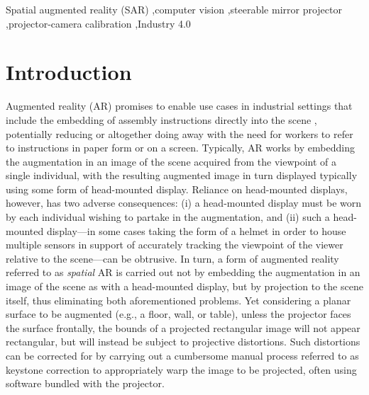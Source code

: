 \documentclass[review]{elsarticle}
\begin{document}
\begin{frontmatter}
\begin{keyword}
Spatial augmented reality (SAR) \sep computer vision \sep steerable mirror projector \sep projector-camera calibration \sep Industry 4.0
\end{keyword}

\end{frontmatter}

\linenumbers

\section{Introduction}\label{sec:intro}

Augmented reality (AR) \cite{van2010survey,zhou2008trends} promises to enable use cases in industrial settings that include the embedding of assembly instructions directly into the scene \cite{schlund2018moglichkeiten,masood2019augmented,gattullo2019towards,uva2018evaluating,rupprecht2020information,Rupprecht2021}, potentially reducing or altogether doing away with the need for workers to refer to instructions in paper form or on a screen. Typically, AR works by embedding the augmentation in an image of the scene acquired from the viewpoint of a single individual, with the resulting augmented image in turn displayed typically using some form of head-mounted display. Reliance on head-mounted displays, however, has two adverse consequences: (i) a head-mounted display must be worn by each individual wishing to partake in the augmentation, and (ii) such a head-mounted display---in some cases taking the form of a helmet in order to house multiple sensors in support of accurately tracking the viewpoint of the viewer relative to the scene---can be obtrusive. In turn, a form of augmented reality referred to as \textit{spatial} AR\cite{bimber2019spatial} is carried out not by embedding the augmentation in an image of the scene as with a head-mounted display, but by projection to the scene itself, thus eliminating both aforementioned problems. Yet considering a planar surface to be augmented (e.g., a floor, wall, or table), unless the projector faces the surface frontally, the bounds of a projected rectangular image will not appear rectangular, but will instead be subject to projective distortions. Such distortions can be corrected for by carrying out a cumbersome manual process referred to as keystone correction to appropriately warp the image to be projected, often using software bundled with the projector.
\end{document}
